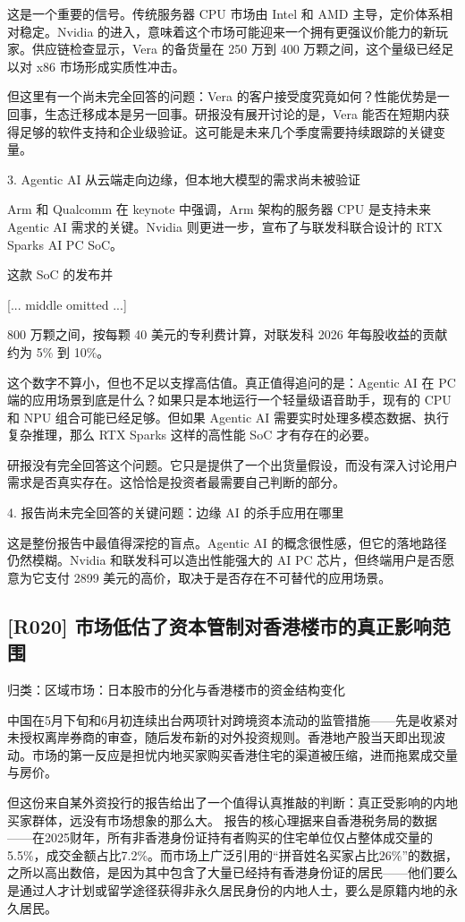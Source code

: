 \documentclass[11pt]{ctexart}
\begin{document}
这是一个重要的信号。传统服务器 CPU 市场由 Intel 和 AMD 主导，定价体系相对稳定。Nvidia 的进入，意味着这个市场可能迎来一个拥有更强议价能力的新玩家。供应链检查显示，Vera 的备货量在 250 万到 400 万颗之间，这个量级已经足以对 x86 市场形成实质性冲击。

但这里有一个尚未完全回答的问题：Vera 的客户接受度究竟如何？性能优势是一回事，生态迁移成本是另一回事。研报没有展开讨论的是，Vera 能否在短期内获得足够的软件支持和企业级验证。这可能是未来几个季度需要持续跟踪的关键变量。

3. Agentic AI 从云端走向边缘，但本地大模型的需求尚未被验证

Arm 和 Qualcomm 在 keynote 中强调，Arm 架构的服务器 CPU 是支持未来 Agentic AI 需求的关键。Nvidia 则更进一步，宣布了与联发科联合设计的 RTX Sparks AI PC SoC。

这款 SoC 的发布并

[... middle omitted ...]

 800 万颗之间，按每颗 40 美元的专利费计算，对联发科 2026 年每股收益的贡献约为 5\% 到 10\%。

这个数字不算小，但也不足以支撑高估值。真正值得追问的是：Agentic AI 在 PC 端的应用场景到底是什么？如果只是本地运行一个轻量级语音助手，现有的 CPU 和 NPU 组合可能已经足够。但如果 Agentic AI 需要实时处理多模态数据、执行复杂推理，那么 RTX Sparks 这样的高性能 SoC 才有存在的必要。

研报没有完全回答这个问题。它只是提供了一个出货量假设，而没有深入讨论用户需求是否真实存在。这恰恰是投资者最需要自己判断的部分。

4. 报告尚未完全回答的关键问题：边缘 AI 的杀手应用在哪里

这是整份报告中最值得深挖的盲点。Agentic AI 的概念很性感，但它的落地路径仍然模糊。Nvidia 和联发科可以造出性能强大的 AI PC 芯片，但终端用户是否愿意为它支付 2899 美元的高价，取决于是否存在不可替代的应用场景。

\subsection{[R020] 市场低估了资本管制对香港楼市的真正影响范围}
{\small\color{refgray}归类：区域市场：日本股市的分化与香港楼市的资金结构变化}

中国在5月下旬和6月初连续出台两项针对跨境资本流动的监管措施——先是收紧对未授权离岸券商的审查，随后发布新的对外投资规则。香港地产股当天即出现波动。市场的第一反应是担忧内地买家购买香港住宅的渠道被压缩，进而拖累成交量与房价。

但这份来自某外资投行的报告给出了一个值得认真推敲的判断：真正受影响的内地买家群体，远没有市场想象的那么大。 报告的核心理据来自香港税务局的数据——在2025财年，所有非香港身份证持有者购买的住宅单位仅占整体成交量的5.5\%，成交金额占比7.2\%。而市场上广泛引用的“拼音姓名买家占比26\%”的数据，之所以高出数倍，是因为其中包含了大量已经持有香港身份证的居民——他们要么是通过人才计划或留学途径获得非永久居民身份的内地人士，要么是原籍内地的永久居民。
\end{document}
